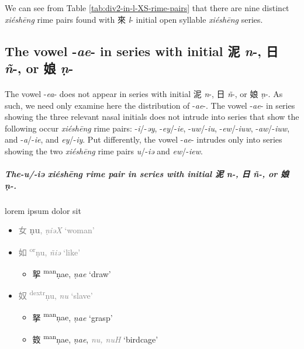 We can see from Table \ref{tab:div2-in-l-XS-rime-pairs} that there are nine distinct \textit{xiéshēng} rime pairs found with  來 \textit{l}- initial open syllable \textit{xiéshēng} series. 



\subsection{The vowel -\textit{ae}- in series with initial 泥 \textit{n}-, 日 \textit{ñ}-, or 娘  \textit{ṇ}-}
\paragraph{}
The vowel -\textit{ea}- does not appear in series with initial 泥 \textit{n}-, 日 \textit{ñ}-, or 娘  \textit{ṇ}-. As such, we need only examine here the distribution of -\textit{ae}-. 
The vowel -\textit{ae}- in series showing the three relevant nasal initials does not intrude into series that show the following occur \textit{xiéshēng} rime pairs:
    -\textit{i}/-\textit{əy},
    -\textit{ey}/-\textit{ie},  
    -\textit{uw}/-\textit{iu},  
    -\textit{ew}/-\textit{iuw}, 
   -\textit{aw}/-\textit{iuw}, and 
    -\textit{a}/-\textit{ie}, 
    and \textit{ey}/-\textit{iy}. Put differently, the vowel -\textit{ae}- intrudes only into series showing   the two \textit{xiéshēng} rime pairs \textit{u}/-\textit{iə} and \textit{ew}/-\textit{iew}. 

\subparagraph{The-\textit{u}/-\textit{iə} \textit{xiéshēng} rime pair in series with initial 泥 \textit{n}-, 日 \textit{ñ}-, or 娘  \textit{ṇ}-.}

lorem ipsum dolor sit 

\begin{itemize}
\item
{\textcolor{gray}{
{\Large{女}} 
{\large{\textbf{ṇu}}},
\emph{ṇiəX} 
`woman'}}

    \item {\textcolor{gray}{{\Large{如}} %
    {\large{{\textsuperscript{or}ṇu}}},
    \textit{ñiə} %
    `like'}}

\begin{itemize}


\item {\Large{挐}} %
    {\large{{\textsuperscript{man}ṇae}}},
    \textit{ṇae} %
    `draw'
\end{itemize}

    \item {\textcolor{gray}{{\Large{奴}} %
  {\large{{\textsuperscript{dextr}ṇu}}},
    \textit{nu} %
    `slave'}}
\begin{itemize}
\item {\Large{拏}} %
    {\large{{\textsuperscript{man}ṇae}}},
    \textit{ṇae} %
    `grasp'

\item {\Large{笯}} %
    {\large{{\textsuperscript{man}ṇae}}},
    \textit{ṇae}, {\textcolor{gray}{\textit{nu, nuH}}} %
    `birdcage'
    \end{itemize}
\end{itemize}





